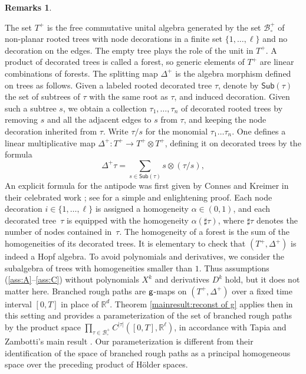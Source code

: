 \documentclass[11pt]{article}
\numberwithin{equation}{section}
\theoremstyle{plain}
\theoremstyle{definition}
\newtheorem*{remarks*} {Remarks}
\newcommand{\bbR}{\mathbb{R}}
\newcommand{\mcB}{\mathcal{B}}
\begin{document}
\begin{remarks*}
\begin{enumerate}
The set $T^+$ is the free commutative unital algebra generated by the set $\mcB^+_\circ$ of non-planar rooted trees with node decorations in a finite set $\{1,\dots,\ell\}$ and no decoration on the edges. The empty tree plays the role of the unit in $T^+$. A product of decorated trees is called a forest, so generic elements of $T^+$ are linear combinations of forests. The splitting map $\Delta^+$ is the algebra morphism defined on trees as follows. Given a labeled rooted decorated tree $\tau$, denote by $\textsf{Sub}(\tau)$ the set of subtrees of $\tau$ with the same root as $\tau$, and induced decoration. Given such a subtree $s$, we obtain a collection $\tau_1,\dots,\tau_n$ of decorated rooted trees by removing $s$ and all the adjacent edges to $s$ from $\tau$, and keeping the node decoration inherited from $\tau$. Write $\tau/s$ for the monomial $\tau_1\dots\tau_n$. One defines a linear multiplicative map $\Delta^+ : T^+ \to T^+\otimes T^+$, defining it on decorated trees by the formula\vspace*{-3pt}
\[
\Delta^+\tau = \sum_{s\in\textsf{Sub}(\tau)} s\otimes (\tau/s),
\]
An explicit formula for the antipode was first given by Connes and Kreimer in their celebrated work \cite{CK}; see \cite{CHV} for a simple and enlightening proof. Each node decoration $i\in\{1,\dots,\ell\}$ is assigned a homogeneity $\alpha\in(0,1)$,
and each decorated tree~$\tau$ is equipped with the homogeneity $\alpha(\sharp\tau)$, where $\sharp\tau$ denotes the number of nodes \hbox{contained} in~$\tau$. The homogeneity of a forest is the sum of the homogeneities of its decorated trees. It is elementary to check that $(T^+,\Delta^+)$ is indeed a Hopf algebra. To avoid polynomials and derivatives, we consider the subalgebra of trees with homo\-geneities smaller than $1$. Thus assumptions (\ref{ass:A}--\ref{ass:C}) without polynomials $X^k$ and derivatives $D^k$ hold, but it does not matter here.
Branched rough paths are $\sf g$-maps on $(T^+,\Delta^+)$ over a fixed time interval $[0,T]$ in place of $\bbR^d$. Theorem \ref{mainresult:reconst of g} applies then in this setting and provides a parameterization of the set of branched rough paths by the product space $\prod_{\tau\in\mcB_\circ^+} C^{\vert\tau\vert}([0,T], \bbR^\ell)$, in accordance with Tapia and Zambotti's main result \cite[Th.\,1.2 \& Cor.\,1.3]{TZ18}. Our parameterization is different from their identification of the space of branched rough paths as a principal homogeneous space over the preceding product of Hölder spaces.


\end{enumerate}
\end{remarks*}
\end{document}
